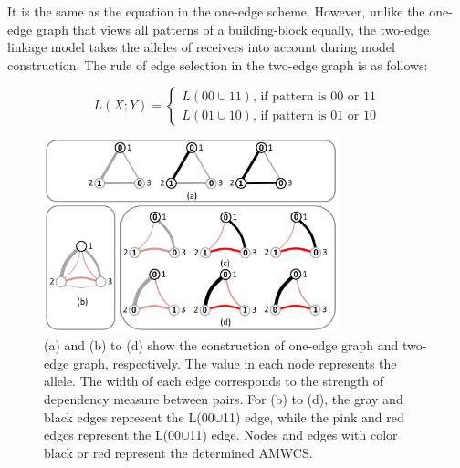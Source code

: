 \documentclass{sig-alternate-05-2015}
\begin{document}
 It is the same as the equation in the  one-edge scheme. However, unlike the one-edge graph that views all patterns of a building-block equally, the two-edge linkage model takes the alleles of receivers into account during model construction. The rule of edge selection in the two-edge graph is as follows:

\begin{equation}
L(X;Y) = 
   \begin{cases}
    L(00\cup11) \text{, if pattern is 00 or 11} \\
    L(01\cup10) \text{, if pattern is 01 or 10} 
	\end{cases}
\end{equation}



\begin{figure}
\centering
\includegraphics[width=3.4in]{AMWCS}
\caption{(a)  and (b) to (d) show the construction of  one-edge graph and two-edge graph, respectively. The value in each node represents the allele. The width of each edge corresponds to the strength of dependency measure between pairs. For (b) to (d), the gray and black edges represent the L(00$\cup$11) edge, while the pink and red edges represent the L(00$\cup$11) edge. Nodes and edges with color black or red represent the determined AMWCS.}
\end{figure}
\end{document}
